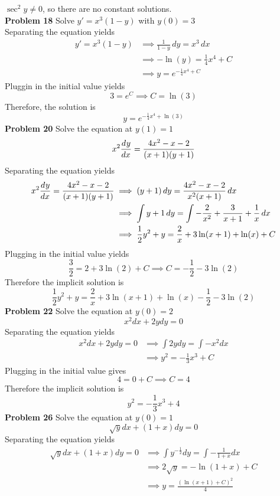 $\sec^2 y \neq 0$, so there are no constant solutions. \\
\textbf{Problem 18}
Solve $y' = x^3(1-y)$ with $y(0) = 3$ \\
\solution 
Separating the equation yields 
\begin{align*}
    y' = x^3(1-y)
    &\implies \frac{1}{1-y} \,dy = x^3 \,dx \\
    &\implies -\ln(y) = \frac{1}{4}x^4 + C \\
    &\implies y = e^{-\frac{1}{4}x^4 + C}
\end{align*}
Pluggin in the initial value yields 
\[
    3 = e^{C} \implies C = \ln(3)
\]
Therefore, the solution is 
\[
    y = e^{-\frac{1}{4}x^4 + \ln(3)}
\]
\textbf{Problem 20}
Solve the equation at $y(1) = 1$
\[
    x^2 \frac{d^{} y}{d x^{}} = \frac{4x^2-x-2}{(x+1)(y+1)}
\]
\solution 
Separating the equation yields 
\begin{align*}
    x^2 \frac{d^{} y}{d x^{}} = \frac{4x^2-x-2}{(x+1)(y+1)} 
    &\implies (y+1) \,dy = \frac{4x^2-x-2}{x^2(x+1)} \,dx \\
    &\implies \int y+1 \,dy 
        = \int -\frac{2}{x^2} + \frac{3}{x+1} + \frac{1}{x} \,dx\\
    &\implies \frac{1}{2}y^2 + y 
        = \frac{2}{x} + 3\ln(x+1) + \ln(x) + C \\
\end{align*}
Plugging in the initial value yields
\[
    \frac{3}{2} = 2 + 3\ln(2) + C 
    \implies C = -\frac{1}{2} - 3\ln(2)
\]
Therefore the implicit solution is 
\[
    \frac{1}{2}y^2 + y 
    = \frac{2}{x} + 3\ln(x+1) + \ln(x) -\frac{1}{2} - 3\ln(2)
\]
\textbf{Problem 22}
Solve the equation at $y(0) = 2$
\[
    x^2 dx + 2y dy = 0
\]
\solution 
Separating the equation yields 
\begin{align*}
    x^2 dx + 2y dy = 0
    &\implies \int 2y dy = \int -x^2 dx \\
    &\implies y^2 = -\frac{1}{3} x^3 + C
\end{align*}
Plugging in the initial value gives
\[
    4 = 0 + C \implies C = 4
\]
Therefore the implicit solution is 
\[
    y^2 = -\frac{1}{3} x^3 + 4
\]
\textbf{Problem 26}
Solve the equation at $y(0) = 1$
\[
    \sqrt{y} dx + (1+x) dy = 0
\]
\solution 
Separating the equation yields 
\begin{align*}
    \sqrt{y} dx + (1+x) dy = 0
    &\implies \int y^{-\frac{1}{2}} dy = \int -\frac{1}{1+x} dx \\
    &\implies 2\sqrt{y} = -\ln(1+x) + C \\
    &\implies y  = \frac{(\ln(x+1) + C)^2}{4}
\end{align*}
